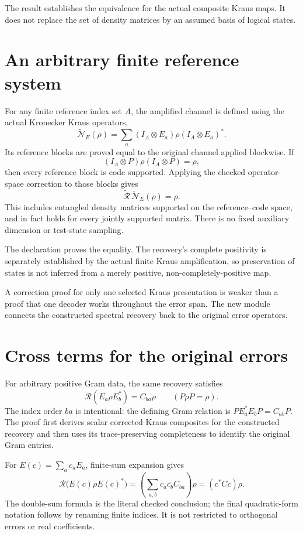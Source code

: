 \documentclass[10pt,letterpaper]{article}
\newcommand{\pageheading}[2]{\vspace*{2pt}{\small\color{ink}\textsc{#1}}\par\vspace{2pt}{\Large\bfseries #2}\par\vspace{4pt}}
\begin{document}
The result  establishes the equivalence for the actual composite Kraus maps. It does not replace the set of density matrices by an assumed basis of logical states.

\section*{An arbitrary finite reference system}
For any finite reference index set $A$, the amplified channel is defined using the actual Kronecker Kraus operators,
\[
\widetilde{\mathcal N}_E(\rho)
=\sum_a(I_A\otimes E_a)\rho(I_A\otimes E_a)^*.
\]
Its reference blocks are proved equal to the original channel applied blockwise. If
\[
(I_A\otimes P)\rho(I_A\otimes P)=\rho,
\]
then every reference block is code supported. Applying the checked operator-space correction to those blocks gives
\[
\boxed{\widetilde{\mathcal R}\,\widetilde{\mathcal N}_E(\rho)=\rho.}
\]
This includes entangled density matrices supported on the reference--code space, and in fact holds for every jointly supported matrix. There is no fixed auxiliary dimension or test-state sampling.

The declaration  proves the equality. The recovery's complete positivity is separately established by the actual finite Kraus amplification, so preservation of states is not inferred from a merely positive, non-completely-positive map.

\newpage
\pageheading{One recovery for the error family}{Coherent combinations and normalization}
A correction proof for only one selected Kraus presentation is weaker than a proof that one decoder works throughout the error span. The new module connects the constructed spectral recovery back to the original error operators.

\section*{Cross terms for the original errors}
For arbitrary positive Gram data, the same recovery satisfies
\[
\boxed{\mathcal R(E_a\rho E_b^*)=C_{ba}\rho\qquad(P\rho P=\rho).}
\]
The index order $ba$ is intentional: the defining Gram relation is $PE_a^*E_bP=C_{ab}P$. The proof first derives scalar corrected Kraus composites for the constructed recovery and then uses its trace-preserving completeness to identify the original Gram entries.

For $E(c)=\sum_a c_aE_a$, finite-sum expansion gives
\[
\mathcal R\bigl(E(c)\rho E(c)^*\bigr)
=\left(\sum_{a,b}c_a\overline{c_b}C_{ba}\right)\rho
=(c^*Cc)\rho.
\]
The double-sum formula is the literal checked conclusion; the final quadratic-form notation follows by renaming finite indices. It is not restricted to orthogonal errors or real coefficients.
\end{document}
